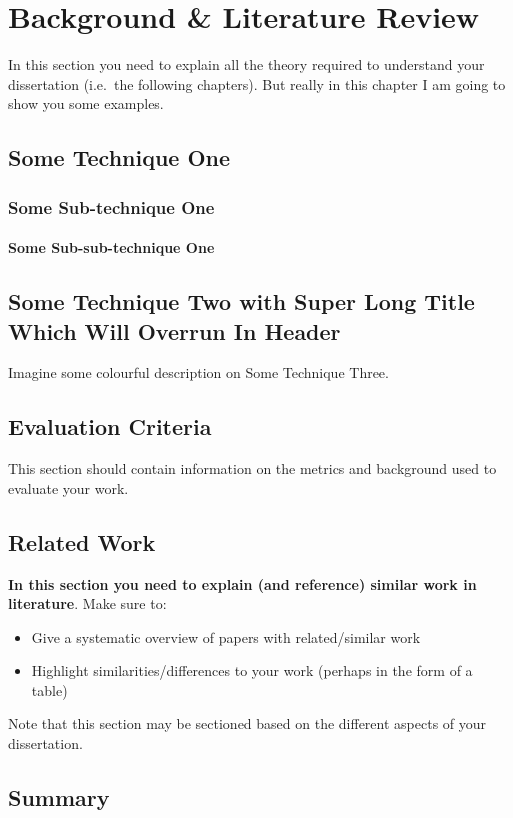 \chapter{Background \& Literature Review}

In this section you need to explain all the theory required to understand your dissertation (i.e.\ the following chapters).
But really in this chapter I am going to show you some examples.

\section{Some Technique One}
\blindtext
\subsection{Some Sub-technique One}
\blindtext
{}
\blindtext
\subsubsection{Some Sub-sub-technique One}
\blindtext
{}
\blindtext
{}

\section[Some Technique Two]{Some Technique Two with Super Long Title Which Will Overrun In Header}
\blindtext

Imagine some colourful description on Some Technique Three.


\section{Evaluation Criteria}
This section should contain information on the metrics and background used to evaluate your work.

\section{Related Work}
\textbf{In this section you need to explain (and reference) similar work in literature}.
Make sure to:

\begin{itemize}
 \item Give a systematic overview of papers with related/similar work
 \item Highlight similarities/differences to your work (perhaps in the form of a table)
\end{itemize}

Note that this section may be sectioned based on the different aspects of your dissertation.

\section{Summary}
\blindtext
